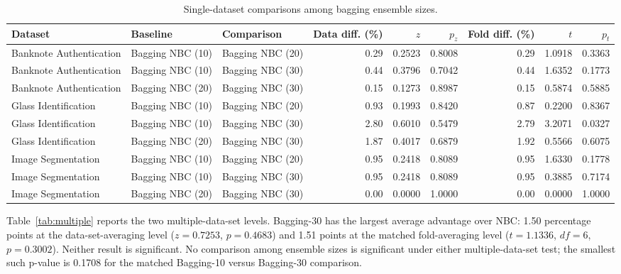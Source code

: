 \documentclass[11pt]{article}
\begin{document}
\begin{table}[H]
\centering
\scriptsize
\caption{Single-dataset comparisons among bagging ensemble sizes.}
\label{tab:single-bagging}
\setlength{\tabcolsep}{3pt}
\begin{tabular}{lllrrrrrr}
\toprule
Dataset & Baseline & Comparison & Data diff. (\%) & $z$ & $p_z$ & Fold diff. (\%) & $t$ & $p_t$ \\
\midrule
Banknote Authentication & Bagging NBC (10) & Bagging NBC (20) & 0.29 & 0.2523 & 0.8008 & 0.29 & 1.0918 & 0.3363 \\
Banknote Authentication & Bagging NBC (10) & Bagging NBC (30) & 0.44 & 0.3796 & 0.7042 & 0.44 & 1.6352 & 0.1773 \\
Banknote Authentication & Bagging NBC (20) & Bagging NBC (30) & 0.15 & 0.1273 & 0.8987 & 0.15 & 0.5874 & 0.5885 \\
Glass Identification & Bagging NBC (10) & Bagging NBC (20) & 0.93 & 0.1993 & 0.8420 & 0.87 & 0.2200 & 0.8367 \\
Glass Identification & Bagging NBC (10) & Bagging NBC (30) & 2.80 & 0.6010 & 0.5479 & 2.79 & 3.2071 & 0.0327 \\
Glass Identification & Bagging NBC (20) & Bagging NBC (30) & 1.87 & 0.4017 & 0.6879 & 1.92 & 0.5566 & 0.6075 \\
Image Segmentation & Bagging NBC (10) & Bagging NBC (20) & 0.95 & 0.2418 & 0.8089 & 0.95 & 1.6330 & 0.1778 \\
Image Segmentation & Bagging NBC (10) & Bagging NBC (30) & 0.95 & 0.2418 & 0.8089 & 0.95 & 0.3885 & 0.7174 \\
Image Segmentation & Bagging NBC (20) & Bagging NBC (30) & 0.00 & 0.0000 & 1.0000 & 0.00 & 0.0000 & 1.0000 \\
\bottomrule
\end{tabular}
\end{table}

Table~\ref{tab:multiple} reports the two multiple-data-set levels. Bagging-30 has the largest average advantage over NBC: 1.50 percentage points at the data-set-averaging level ($z=0.7253$, $p=0.4683$) and 1.51 points at the matched fold-averaging level ($t=1.1336$, $df=6$, $p=0.3002$). Neither result is significant. No comparison among ensemble sizes is significant under either multiple-data-set test; the smallest such p-value is 0.1708 for the matched Bagging-10 versus Bagging-30 comparison.
\end{document}

